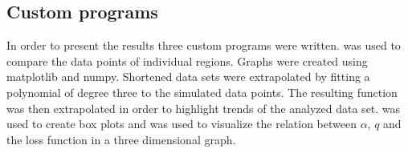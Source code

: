 \subsection{Custom programs}
In order to present the results three custom programs were written.  was used to compare the data points of
individual regions. Graphs were created using matplotlib and numpy. Shortened data sets were extrapolated by fitting a polynomial
of degree three to the simulated data points. The resulting function was then extrapolated in order to highlight trends of the
analyzed data set.  was used to create box plots and  was used to visualize the
relation between $\alpha$, $q$ and the loss function in a three dimensional graph.
